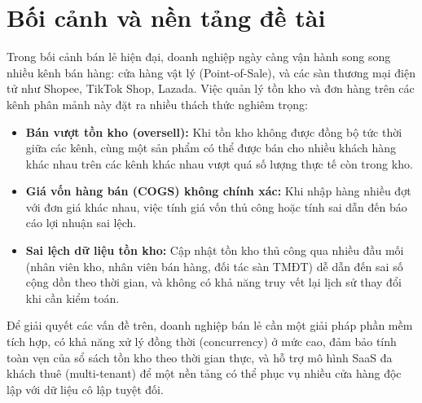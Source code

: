 \section{Bối cảnh và nền tảng đề tài}

Trong bối cảnh bán lẻ hiện đại, doanh nghiệp ngày càng vận hành song song nhiều kênh bán hàng: cửa hàng vật lý (Point-of-Sale), và các sàn thương mại điện tử như Shopee, TikTok Shop, Lazada. Việc quản lý tồn kho và đơn hàng trên các kênh phân mảnh này đặt ra nhiều thách thức nghiêm trọng:

\begin{itemize}
    \item \textbf{Bán vượt tồn kho (oversell):} Khi tồn kho không được đồng bộ tức thời giữa các kênh, cùng một sản phẩm có thể được bán cho nhiều khách hàng khác nhau trên các kênh khác nhau vượt quá số lượng thực tế còn trong kho.
    \item \textbf{Giá vốn hàng bán (COGS) không chính xác:} Khi nhập hàng nhiều đợt với đơn giá khác nhau, việc tính giá vốn thủ công hoặc tính sai dẫn đến báo cáo lợi nhuận sai lệch.
    \item \textbf{Sai lệch dữ liệu tồn kho:} Cập nhật tồn kho thủ công qua nhiều đầu mối (nhân viên kho, nhân viên bán hàng, đối tác sàn TMĐT) dễ dẫn đến sai số cộng dồn theo thời gian, và không có khả năng truy vết lại lịch sử thay đổi khi cần kiểm toán.
\end{itemize}

Để giải quyết các vấn đề trên, doanh nghiệp bán lẻ cần một giải pháp phần mềm tích hợp, có khả năng xử lý đồng thời (concurrency) ở mức cao, đảm bảo tính toàn vẹn của sổ sách tồn kho theo thời gian thực, và hỗ trợ mô hình SaaS đa khách thuê (multi-tenant) để một nền tảng có thể phục vụ nhiều cửa hàng độc lập với dữ liệu cô lập tuyệt đối.
